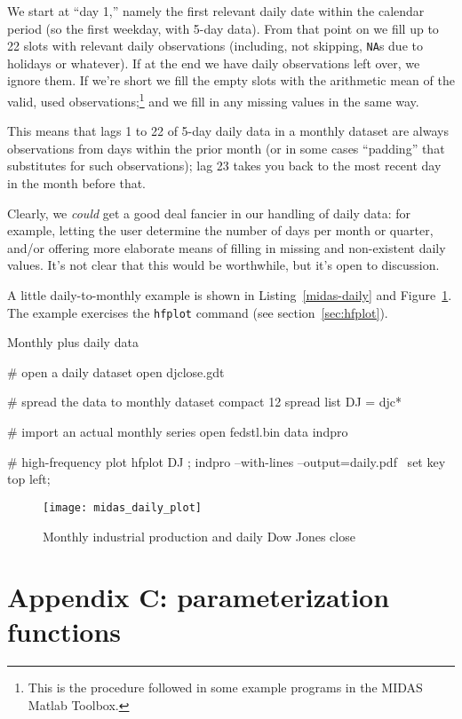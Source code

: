 \documentclass{article}
\begin{document}
We start at ``day 1,'' namely the first relevant daily date within the
calendar period (so the first weekday, with 5-day data). From that
point on we fill up to 22 slots with relevant daily observations
(including, not skipping, \texttt{NA}s due to holidays or whatever).
If at the end we have daily observations left over, we ignore them. If
we're short we fill the empty slots with the arithmetic mean of the
valid, used observations;\footnote{This is the procedure followed in
  some example programs in the \textsf{MIDAS Matlab Toolbox}.} and we
fill in any missing values in the same way.

This means that lags 1 to 22 of 5-day daily data in a monthly dataset
are always observations from days within the prior month (or in some
cases ``padding'' that substitutes for such observations); lag 23
takes you back to the most recent day in the month before that.

Clearly, we \textit{could} get a good deal fancier in our handling of
daily data: for example, letting the user determine the number of days
per month or quarter, and/or offering more elaborate means of filling
in missing and non-existent daily values. It's not clear that this
would be worthwhile, but it's open to discussion.

A little daily-to-monthly example is shown in
Listing~\ref{midas-daily} and Figure~\ref{fig:daily}. The example
exercises the \texttt{hfplot} command (see section~\ref{sec:hfplot}).

\begin{script}[htbp]
  \caption{Monthly plus daily data}
  \label{midas-daily}
\begin{scode}
# open a daily dataset
open djclose.gdt

# spread the data to monthly
dataset compact 12 spread
list DJ = djc*

# import an actual monthly series
open fedstl.bin
data indpro

# high-frequency plot
hfplot DJ ; indpro --with-lines --output=daily.pdf \
 {set key top left;}
\end{scode}
\end{script}

\begin{figure}[htbp]
  \centering
  \texttt{[image: midas\_daily\_plot]}
  \caption{Monthly industrial production and daily Dow Jones close}
  \label{fig:daily}
\end{figure}

\clearpage

\section*{Appendix C: parameterization functions}
\label{app:c}
\end{document}
